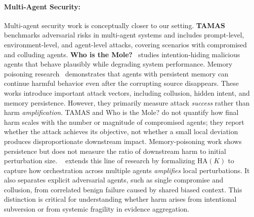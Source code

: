 \paragraph{Multi-Agent Security:}
Multi-agent security work is conceptually closer to our setting. \textbf{TAMAS}~\cite{kavathekar2025tamas} benchmarks adversarial risks in multi-agent systems and includes prompt-level, environment-level, and agent-level attacks, covering scenarios with compromised and colluding agents. \textbf{Who is the Mole?}~\cite{xie2025s} studies intention-hiding malicious agents that behave plausibly while degrading system performance. Memory poisoning research~\cite{sunil2026memory} demonstrates that agents with persistent memory can continue harmful behavior even after the corrupting source disappears. These works introduce important attack vectors, including collusion, hidden intent, and memory persistence. However, they primarily measure attack \textit{success} rather than harm \textit{amplification}. TAMAS and Who is the Mole? do not quantify how final harm scales with the number or magnitude of compromised agents; they report whether the attack achieves its objective, not whether a small local deviation produces disproportionate downstream impact. Memory-poisoning work shows persistence but does not measure the ratio of downstream harm to initial perturbation size. \proposed~ extends this line of research by formalizing $\text{HA}(K)$ to capture how orchestration across multiple agents \textit{amplifies} local perturbations. It also separates explicit adversarial agents, such as single compromise and collusion, from correlated benign failure caused by shared biased context. This distinction is critical for understanding whether harm arises from intentional subversion or from systemic fragility in evidence aggregation.

